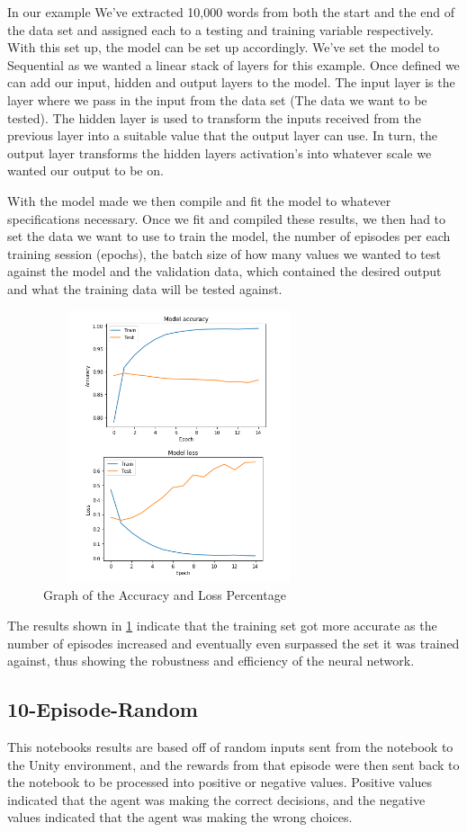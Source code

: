 In our example We’ve extracted 10,000 words from both the start and the end of the data set and assigned each to a testing and training variable respectively. With this set up, the model can be set up accordingly. We’ve set the model to Sequential as we wanted a linear stack of layers for this example. Once defined we can add our input, hidden and output layers to the model. The input layer is the layer where we pass in the input from the data set (The data we want to be tested). The hidden layer is used to transform the inputs received from the previous layer into a suitable value that the output layer can use. In turn, the output layer transforms the hidden layers activation's into whatever scale we wanted our output to be on. 

With the model made we then compile and fit the model to whatever specifications necessary. Once we fit and compiled these results, we then had to set the data we want to use to train the model, the number of episodes per each training session (epochs), the batch size of how many values we wanted to test against the model and the validation data, which contained the desired output and what the training data will be tested against.
\begin{figure}[H]
    \centering
    \includegraphics[width=80mm, height=80mm]{img/IMBD_results.PNG}
    \caption{Graph of the Accuracy and Loss Percentage}
    \label{fig:graph-results}
\end{figure}
The results shown in \ref{fig:graph-results} indicate that the training set got more accurate as the number of episodes increased and eventually even surpassed the set it was trained against, thus showing the robustness and efficiency of the neural network.

\subsection{10-Episode-Random}
This notebooks results are based off of random inputs sent from the notebook to the Unity environment, and the rewards from that episode were then sent back to the notebook to be processed into positive or negative values. Positive values indicated that the agent was making the correct decisions, and the negative values indicated that the agent was making the wrong choices. 

